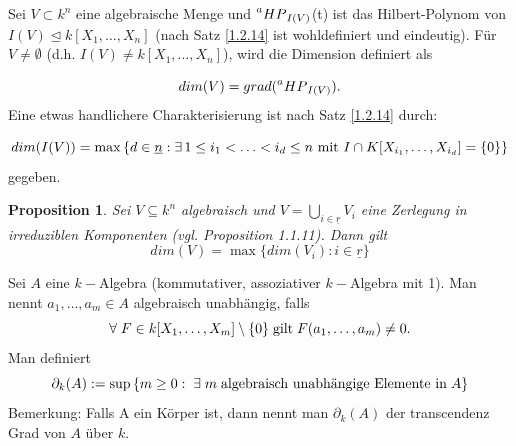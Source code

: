 \documentclass{beamer}
\newtheorem{proposition}{Proposition}
\newcommand*{\R}{k[X_{1},\ldots,X_{n}]}
\newcommand*{\indx}[2]{{#1}_{#2}}
\newcommand*{\hp}[1]{$\prescript{a}{}{HP}_{#1}$}
\begin{document}
\begin{frame}
	\begin{definition}
		Sei $V\subset k^n$ eine algebraische Menge und \hp{I(V)}(t) ist das Hilbert-Polynom von $I(V)\unlhd\R$ (nach Satz \ref{1.2.14} ist wohldefiniert und eindeutig). Für $V\neq\emptyset$ (d.h. $I(V)\neq\R$), wird die Dimension definiert als 
		
		\begin{displaymath}
		dim(V)=grad(\textnormal{\hp{I(V)}}).
		\end{displaymath}
		Eine etwas handlichere Charakterisierung ist nach Satz \ref{1.2.14} durch:
		
		\begin{displaymath}
		dim(I(V))=\max{\{d\in\underline{n}:\exists{\,} 1\leq\indx{i}{1}<\ldots<\indx{i}{d}\leq n \textnormal{ mit } I\cap K[\indx{X}{\indx{i}{1}},\ldots,\indx{X}{\indx{i}{d}}]=\{0\} \}}
		\end{displaymath}
		gegeben.\\
	\end{definition}
\end{frame}

\begin{frame}
	\begin{proposition}
		Sei $V\subseteq k^n$ algebraisch und $V=\bigcup\limits_{i\in\underline{r}}\indx{V}{i}$ eine Zerlegung in irreduziblen Komponenten (vgl. Proposition 1.1.11). Dann gilt
		\begin{displaymath}
		dim(V)=\max{\{dim(\indx{V}{i}):i\in\underline{r}\}}
		\end{displaymath}
	\end{proposition}
\end{frame}

\begin{frame} 
	\begin{definition}
		Sei $A$ eine $k-$Algebra (kommutativer, assoziativer $k-$Algebra mit 1). Man nennt $\indx{a}{1},\ldots,\indx{a}{m}\in A$ algebraisch unabhängig, falls 
		\begin{displaymath}
		\forall \;F\in k[\indx{X}{1},\ldots,\indx{X}{m}]\setminus\{0\} \;\textnormal{gilt}\; F(\indx{a}{1},\ldots,\indx{a}{m})\neq0.
		\end{displaymath}
		Man definiert
		\begin{displaymath}
		\indx{\partial}{k}(A):=\sup{\{m\geq0:\;\exists\; m \;\textnormal{algebraisch unabhängige Elemente in}\; A\}}
		\end{displaymath}
		Bemerkung: Falls A ein Körper ist, dann nennt man $\indx{\partial}{k}(A)$ der transcendenz Grad von $A$ über $k$.\\
	\end{definition}
\end{frame}
\end{document}
